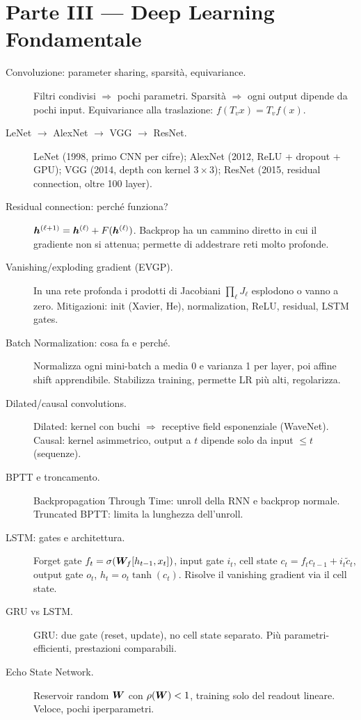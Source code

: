 \section{Parte III — Deep Learning Fondamentale}

\begin{description}
  \item[Convoluzione: parameter sharing, sparsità, equivariance.] Filtri condivisi $\Rightarrow$ pochi parametri. Sparsità $\Rightarrow$ ogni output dipende da pochi input. Equivariance alla traslazione: $f(T_v x) = T_v f(x)$.
  \item[LeNet $\to$ AlexNet $\to$ VGG $\to$ ResNet.] LeNet (1998, primo CNN per cifre); AlexNet (2012, ReLU + dropout + GPU); VGG (2014, depth con kernel $3\times 3$); ResNet (2015, residual connection, oltre 100 layer).
  \item[Residual connection: perché funziona?] $\bm{h}^{(\ell+1)} = \bm{h}^{(\ell)} + F(\bm{h}^{(\ell)})$. Backprop ha un cammino diretto in cui il gradiente non si attenua; permette di addestrare reti molto profonde.
  \item[Vanishing/exploding gradient (EVGP).] In una rete profonda i prodotti di Jacobiani $\prod_\ell J_\ell$ esplodono o vanno a zero. Mitigazioni: init (Xavier, He), normalization, ReLU, residual, LSTM gates.
  \item[Batch Normalization: cosa fa e perché.] Normalizza ogni mini-batch a media 0 e varianza 1 per layer, poi affine shift apprendibile. Stabilizza training, permette LR più alti, regolarizza.
  \item[Dilated/causal convolutions.] Dilated: kernel con buchi $\Rightarrow$ receptive field esponenziale (WaveNet). Causal: kernel asimmetrico, output a $t$ dipende solo da input $\leq t$ (sequenze).
  \item[BPTT e troncamento.] Backpropagation Through Time: unroll della RNN e backprop normale. Truncated BPTT: limita la lunghezza dell'unroll.
  \item[LSTM: gates e architettura.] Forget gate $f_t = \sigma(\bm{W}_f[h_{t-1}, x_t])$, input gate $i_t$, cell state $c_t = f_t c_{t-1} + i_t \tilde c_t$, output gate $o_t$, $h_t = o_t \tanh(c_t)$. Risolve il vanishing gradient via il cell state.
  \item[GRU vs LSTM.] GRU: due gate (reset, update), no cell state separato. Più parametri-efficienti, prestazioni comparabili.
  \item[Echo State Network.] Reservoir random $\bm{W}$ con $\rho(\bm{W})<1$, training solo del readout lineare. Veloce, pochi iperparametri.

\end{description}
